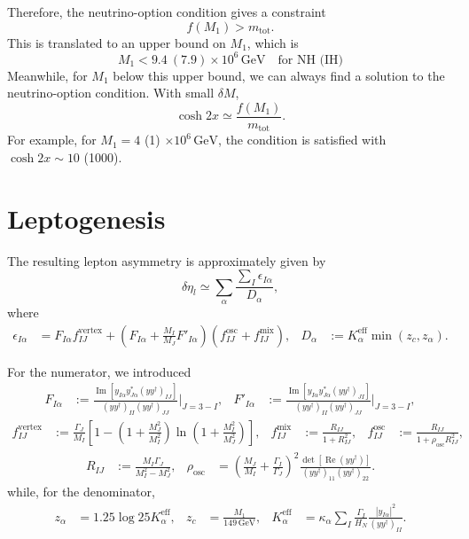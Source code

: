 \documentclass[a4paper,11pt,captions=tableheading,DIV=12]{scrartcl}
\numberwithin{equation}{section}
\newcommand\w[1]{_{\mathrm{#1}}}
\newcommand\unit[1]{\,\mathrm{#1}\xspace}
\newcommand\GeV{\unit{GeV}}
\renewcommand{\Re}{\mathop{\mathrm{Re}}}
\renewcommand{\Im}{\mathop{\mathrm{Im}}}
\newcommand\mtot{m_{\mathrm{tot}}}
\begin{document}
Therefore, the neutrino-option condition gives a constraint
\begin{equation}
 f(M_1) > \mtot.
\end{equation}
This is translated to an upper bound on $M_1$, which is
\begin{equation}
 M_1<9.4\ (7.9)\times10^6\GeV\quad\text{for NH (IH)}
\end{equation}
Meanwhile, for $M_1$ below this upper bound, we can always find a solution to the neutrino-option condition. With small $\delta M$,
\begin{equation}
 \cosh2x\simeq \frac{f(M_1)}{\mtot}.
\end{equation}
For example, for $M_1=4$ (1) $\times10^6\GeV$, the condition is satisfied with $\cosh2x \sim 10$ (1000).


\section{Leptogenesis}
The resulting lepton asymmetry is approximately given by
\begin{equation}
  \delta \eta_l\simeq
\sum_{\alpha}\frac{\sum_I\epsilon_{I\alpha}}{D_\alpha},
\end{equation}
where
\begin{align}
  \epsilon_{I\alpha} &= F_{I\alpha}f^{\mathrm{vertex}}_{IJ}+\left(
F_{I\alpha} + \frac{M_I}{M_J}F'_{I\alpha}
\right)(f^{\mathrm{osc}}_{IJ} + f^{\mathrm{mix}}_{IJ}),
&
  D_\alpha &:= K_\alpha^{\text{eff}}\min(z_c, z_\alpha).
\end{align}

For the numerator, we introduced
\begin{align*}
 F_{I\alpha} &:= \frac{\Im\left[y_{I\alpha}y^*_{J\alpha}(y y^\dagger)_{IJ}\right]}
{(y y^\dagger)_{II}(y y^\dagger)_{JJ}}\Bigg|_{J=3-I},
&
 F'_{I\alpha} &:= \frac{\Im\left[y_{I\alpha}y^*_{J\alpha}(y y^\dagger)_{JI}\right]}
{(y y^\dagger)_{II}(y y^\dagger)_{JJ}}\Bigg|_{J=3-I},
\end{align*}
\begin{align*}
 f^{\text{vertex}}_{IJ}
&:= \frac{\Gamma_J}{M_I}
\left[1-\left(1+\frac{M_J^2}{M_I^2}\right)\ln\left(1+\frac{M_I^2}{M_J^2}\right)\right],
&
 f^{\text{mix}}_{IJ}
&:= \frac{R_{IJ}}
         {1+R_{IJ}^2},&
 f^{\text{osc}}_{IJ}
&:= \frac{R_{IJ}}
         {1+\rho\w{osc} R_{IJ}^2},
\end{align*}
\begin{align*}
  R_{IJ} &:= \frac{M_I\Gamma_J}{M_I^2-M_J^2},
&
 \rho\w{osc} &
= \left(\frac{M_J}{M_I} + \frac{\Gamma_I}{\Gamma_J}\right)^2
\frac{\det\left[\Re(yy^\dagger)\right]}{(yy^\dagger)_{11}(yy^\dagger)_{22}}.
\end{align*}
while, for the denominator,
\begin{align*}
 z_\alpha &= 1.25\log25 K_\alpha^{\mathrm{eff}},&
 z_c &= \frac{M_1}{149\GeV},
&
 K_\alpha^{\mathrm{eff}}
&= \kappa_\alpha \sum_I \frac{\Gamma_I}{H_N}\frac{|y_{I\alpha}|^2}{(yy^\dagger)_{II}}.
\end{align*}
\end{document}
